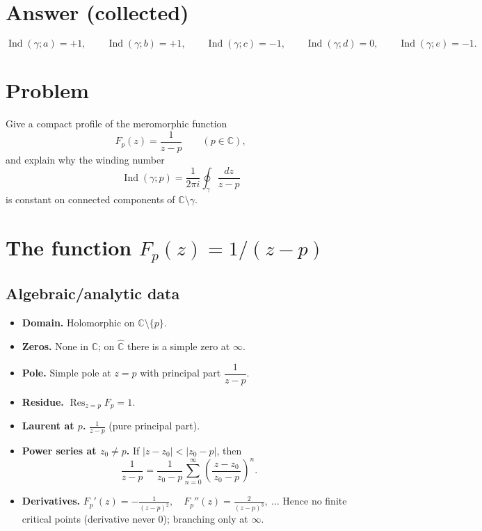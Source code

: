 \documentclass[11pt]{article}
\DeclareMathOperator{\Res}{Res}
\newcommand{\C}{\mathbb{C}}
\newcommand{\Chat}{\widehat{\mathbb{C}}}
\DeclareMathOperator{\Ind}{Ind}
\begin{document}
\section*{Answer (collected)}
\[
\boxed{
	\Ind(\gamma;a)=+1,\qquad
	\Ind(\gamma;b)=+1,\qquad
	\Ind(\gamma;c)=-1,\qquad
	\Ind(\gamma;d)=0,\qquad
	\Ind(\gamma;e)=-1.
}
\]

	
\section*{Problem}
Give a compact profile of the meromorphic function
\[
F_p(z)=\frac{1}{z-p}\qquad(p\in\C),
\]
and explain why the winding number
\[
\Ind(\gamma;p)=\frac{1}{2\pi i}\oint_{\gamma}\frac{dz}{z-p}
\]
is constant on connected components of $\C\setminus\gamma$.

\section*{The function \(F_p(z)=1/(z-p)\)}

\subsection*{Algebraic/analytic data}
\begin{itemize}[leftmargin=2em]
	\item \textbf{Domain.} Holomorphic on $\C\setminus\{p\}$.
	\item \textbf{Zeros.} None in $\C$; on $\Chat$ there is a simple zero at $\infty$.
	\item \textbf{Pole.} Simple pole at $z=p$ with principal part $\dfrac{1}{z-p}$.
	\item \textbf{Residue.} $\Res_{z=p} F_p = 1$.
	\item \textbf{Laurent at \(p\).} \( \displaystyle \frac{1}{z-p} \) (pure principal part).
	\item \textbf{Power series at \(z_0\neq p\).} If $|z-z_0|<|z_0-p|$, then
	\[
	\frac{1}{z-p}=\frac{1}{z_0-p}\sum_{n=0}^{\infty}\!\left(\frac{z-z_0}{\,z_0-p\,}\right)^{\!n}.
	\]
	\item \textbf{Derivatives.} \( \displaystyle F_p'(z)=-\frac{1}{(z-p)^2},\quad
	F_p''(z)=\frac{2}{(z-p)^3},\ \ldots \)
	Hence no finite critical points (derivative never $0$); branching only at $\infty$.
\end{itemize}
\end{document}

